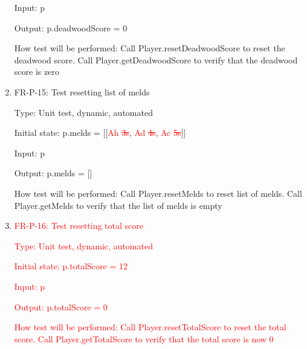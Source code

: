 \documentclass[12pt, titlepage]{article}
\begin{document}
\begin{enumerate}
    Input: p
    
    Output: p.deadwoodScore = 0
    
    How test will be performed: Call Player.resetDeadwoodScore to reset the deadwood score. Call Player.getDeadwoodScore to verify that the deadwood score is zero
    
    \item{FR-P-15: Test resetting list of melds}
    
    Type: Unit test, dynamic, automated	
    
    Initial state: p.melds = [[\textcolor{red}{Ah \sout{3s}}, \textcolor{red}{Ad \sout{4s}}, \textcolor{red}{Ac \sout{5s}}]]
    
    Input: p
    
    Output: p.melds = []
    
    How test will be performed: Call Player.resetMelds to reset list of melds. Call Player.getMelds to verify that the list of melds is empty
    
    
    \item{\textcolor{red}{FR-P-16: Test resetting total score}}
    
    \textcolor{red}{Type: Unit test, dynamic, automated}
    
    \textcolor{red}{Initial state: p.totalScore = 12}
    
    \textcolor{red}{Input: p}
    
    \textcolor{red}{Output: p.totalScore = 0}
    
    \textcolor{red}{How test will be performed: Call Player.resetTotalScore to reset the total score. Call Player.getTotalScore to verify that the total score is now 0}
\end{enumerate}
\end{document}
